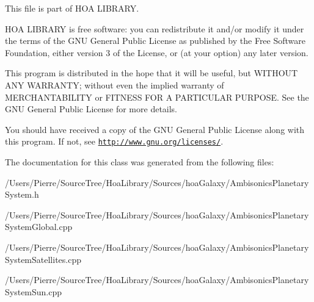 This file is part of H\-O\-A L\-I\-B\-R\-A\-R\-Y.

H\-O\-A L\-I\-B\-R\-A\-R\-Y is free software\-: you can redistribute it and/or modify it under the terms of the G\-N\-U General Public License as published by the Free Software Foundation, either version 3 of the License, or (at your option) any later version.

This program is distributed in the hope that it will be useful, but W\-I\-T\-H\-O\-U\-T A\-N\-Y W\-A\-R\-R\-A\-N\-T\-Y; without even the implied warranty of M\-E\-R\-C\-H\-A\-N\-T\-A\-B\-I\-L\-I\-T\-Y or F\-I\-T\-N\-E\-S\-S F\-O\-R A P\-A\-R\-T\-I\-C\-U\-L\-A\-R P\-U\-R\-P\-O\-S\-E. See the G\-N\-U General Public License for more details.

You should have received a copy of the G\-N\-U General Public License along with this program. If not, see \href{http://www.gnu.org/licenses/}{\tt http\-://www.\-gnu.\-org/licenses/}. 

The documentation for this class was generated from the following files\-:\begin{DoxyCompactItemize}
\item 
/\-Users/\-Pierre/\-Source\-Tree/\-Hoa\-Library/\-Sources/hoa\-Galaxy/Ambisonics\-Planetary\-System.\-h\item 
/\-Users/\-Pierre/\-Source\-Tree/\-Hoa\-Library/\-Sources/hoa\-Galaxy/Ambisonics\-Planetary\-System\-Global.\-cpp\item 
/\-Users/\-Pierre/\-Source\-Tree/\-Hoa\-Library/\-Sources/hoa\-Galaxy/Ambisonics\-Planetary\-System\-Satellites.\-cpp\item 
/\-Users/\-Pierre/\-Source\-Tree/\-Hoa\-Library/\-Sources/hoa\-Galaxy/Ambisonics\-Planetary\-System\-Sun.\-cpp\end{DoxyCompactItemize}
